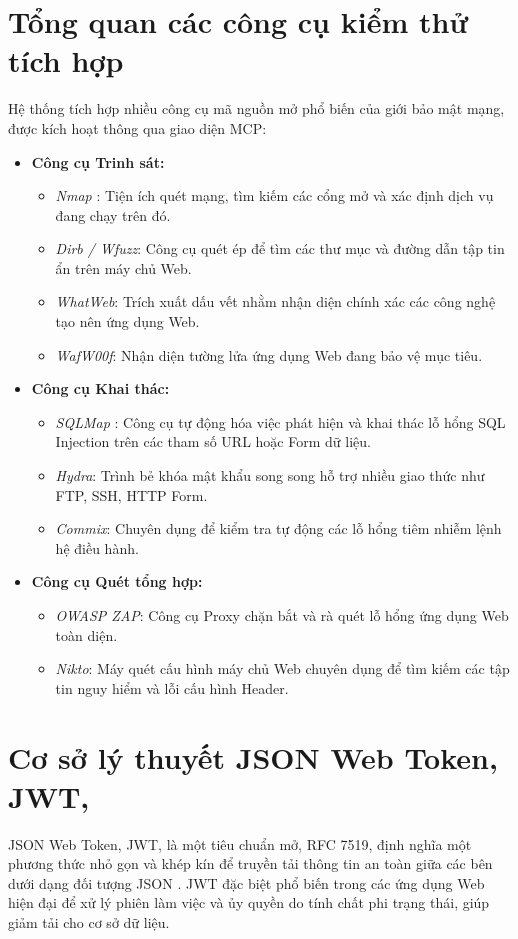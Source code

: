 \section{Tổng quan các công cụ kiểm thử tích hợp}
Hệ thống tích hợp nhiều công cụ mã nguồn mở phổ biến của giới bảo mật mạng, được kích hoạt thông qua giao diện MCP:
\begin{itemize}
    \item \textbf{Công cụ Trinh sát:}
    \begin{itemize}
        \item \textit{Nmap} \cite{nmap2024}: Tiện ích quét mạng, tìm kiếm các cổng mở và xác định dịch vụ đang chạy trên đó.
        \item \textit{Dirb / Wfuzz}: Công cụ quét ép để tìm các thư mục và đường dẫn tập tin ẩn trên máy chủ Web.
        \item \textit{WhatWeb}: Trích xuất dấu vết nhằm nhận diện chính xác các công nghệ tạo nên ứng dụng Web.
        \item \textit{WafW00f}: Nhận diện tường lửa ứng dụng Web đang bảo vệ mục tiêu.
    \end{itemize}
    \item \textbf{Công cụ Khai thác:}
    \begin{itemize}
        \item \textit{SQLMap} \cite{sqlmap2024}: Công cụ tự động hóa việc phát hiện và khai thác lỗ hổng SQL Injection trên các tham số URL hoặc Form dữ liệu.
        \item \textit{Hydra}: Trình bẻ khóa mật khẩu song song hỗ trợ nhiều giao thức như FTP, SSH, HTTP Form.
        \item \textit{Commix}: Chuyên dụng để kiểm tra tự động các lỗ hổng tiêm nhiễm lệnh hệ điều hành.
    \end{itemize}
    \item \textbf{Công cụ Quét tổng hợp:}
    \begin{itemize}
        \item \textit{OWASP ZAP}: Công cụ Proxy chặn bắt và rà quét lỗ hổng ứng dụng Web toàn diện.
        \item \textit{Nikto}: Máy quét cấu hình máy chủ Web chuyên dụng để tìm kiếm các tập tin nguy hiểm và lỗi cấu hình Header.
    \end{itemize}
\end{itemize}

\section{Cơ sở lý thuyết JSON Web Token, JWT,}
JSON Web Token, JWT, là một tiêu chuẩn mở, RFC 7519, định nghĩa một phương thức nhỏ gọn và khép kín để truyền tải thông tin an toàn giữa các bên dưới dạng đối tượng JSON \cite{jwt2015}. JWT đặc biệt phổ biến trong các ứng dụng Web hiện đại để xử lý phiên làm việc và ủy quyền do tính chất phi trạng thái, giúp giảm tải cho cơ sở dữ liệu.

